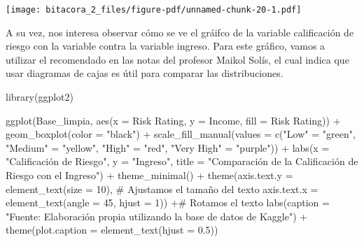 \documentclass[
  letterpaper,
  DIV=11,
  numbers=noendperiod]{scrreprt}
\newenvironment{Shaded}{\begin{snugshade}}{\end{snugshade}}
\newcommand{\AttributeTok}[1]{\textcolor[rgb]{0.40,0.45,0.13}{#1}}
\newcommand{\CommentTok}[1]{\textcolor[rgb]{0.37,0.37,0.37}{#1}}
\newcommand{\DecValTok}[1]{\textcolor[rgb]{0.68,0.00,0.00}{#1}}
\newcommand{\FloatTok}[1]{\textcolor[rgb]{0.68,0.00,0.00}{#1}}
\newcommand{\FunctionTok}[1]{\textcolor[rgb]{0.28,0.35,0.67}{#1}}
\newcommand{\NormalTok}[1]{\textcolor[rgb]{0.00,0.23,0.31}{#1}}
\newcommand{\OtherTok}[1]{\textcolor[rgb]{0.00,0.23,0.31}{#1}}
\newcommand{\SpecialCharTok}[1]{\textcolor[rgb]{0.37,0.37,0.37}{#1}}
\newcommand{\StringTok}[1]{\textcolor[rgb]{0.13,0.47,0.30}{#1}}
\begin{document}
\texttt{[image: bitacora\_2\_files/figure-pdf/unnamed-chunk-20-1.pdf]}

A su vez, nos interesa observar cómo se ve el gráifco de la variable
calificación de riesgo con la variable contra la variable ingreso. Para
este gráfico, vamos a utilizar el recomendado en las notas del profesor
Maikol Solís, el cual indica que usar diagramas de cajas es útil para
comparar las distribuciones.

\begin{Shaded}
\begin{Highlighting}[]
\FunctionTok{library}\NormalTok{(ggplot2)}

\FunctionTok{ggplot}\NormalTok{(Base\_limpia, }\FunctionTok{aes}\NormalTok{(}\AttributeTok{x =} \StringTok{\textasciigrave{}}\AttributeTok{Risk Rating}\StringTok{\textasciigrave{}}\NormalTok{, }\AttributeTok{y =}\NormalTok{ Income, }\AttributeTok{fill =} \StringTok{\textasciigrave{}}\AttributeTok{Risk Rating}\StringTok{\textasciigrave{}}\NormalTok{)) }\SpecialCharTok{+}  
  \FunctionTok{geom\_boxplot}\NormalTok{(}\AttributeTok{color =} \StringTok{"black"}\NormalTok{) }\SpecialCharTok{+}  
  \FunctionTok{scale\_fill\_manual}\NormalTok{(}\AttributeTok{values =} \FunctionTok{c}\NormalTok{(}\StringTok{"Low"} \OtherTok{=} \StringTok{"green"}\NormalTok{, }\StringTok{"Medium"} \OtherTok{=} \StringTok{"yellow"}\NormalTok{, }\StringTok{"High"} \OtherTok{=} \StringTok{"red"}\NormalTok{, }\StringTok{"Very High"} \OtherTok{=} \StringTok{"purple"}\NormalTok{)) }\SpecialCharTok{+}  
  \FunctionTok{labs}\NormalTok{(}\AttributeTok{x =} \StringTok{"Calificación de Riesgo"}\NormalTok{, }\AttributeTok{y =} \StringTok{"Ingreso"}\NormalTok{, }\AttributeTok{title =} \StringTok{"Comparación de la Calificación de Riesgo con el Ingreso"}\NormalTok{) }\SpecialCharTok{+} 
  \FunctionTok{theme\_minimal}\NormalTok{() }\SpecialCharTok{+}
  \FunctionTok{theme}\NormalTok{(}\AttributeTok{axis.text.y =} \FunctionTok{element\_text}\NormalTok{(}\AttributeTok{size =} \DecValTok{10}\NormalTok{), }\CommentTok{\# Ajustamos el tamaño del texto}
        \AttributeTok{axis.text.x =} \FunctionTok{element\_text}\NormalTok{(}\AttributeTok{angle =} \DecValTok{45}\NormalTok{, }\AttributeTok{hjust =} \DecValTok{1}\NormalTok{))  }\SpecialCharTok{+}\CommentTok{\# Rotamos el texto}
  \FunctionTok{labs}\NormalTok{(}\AttributeTok{caption =} \StringTok{"Fuente: Elaboración propia utilizando la base de datos de Kaggle"}\NormalTok{) }\SpecialCharTok{+}
\FunctionTok{theme}\NormalTok{(}\AttributeTok{plot.caption =} \FunctionTok{element\_text}\NormalTok{(}\AttributeTok{hjust =} \FloatTok{0.5}\NormalTok{)) }
\end{Highlighting}
\end{Shaded}
\end{document}
